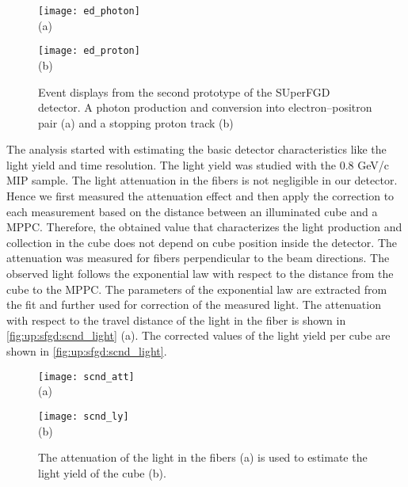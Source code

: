 \documentclass[main.tex]{subfiles}
\begin{document}
\begin{figure}[!ht]
	\centering
	\begin{minipage}{0.49\linewidth}
		\centering
		\texttt{[image: ed\_photon]} \\ (a)
	\end{minipage}
	\begin{minipage}{0.49\linewidth}
		\centering
		\texttt{[image: ed\_proton]} \\ (b)
	\end{minipage}
	\caption{Event displays from the second prototype of the SUperFGD detector. A photon production and conversion into electron--positron pair (a) and a stopping proton track (b)}
	\label{fig:up:sfgd:scnd_ed}
\end{figure}

The analysis started with estimating the basic detector characteristics like the light yield and time resolution. The light yield was studied with the 0.8 GeV/c MIP sample. The light attenuation in the fibers is not negligible in our detector. Hence we first measured the attenuation effect and then apply the correction to each measurement based on the distance between an illuminated cube and a MPPC. Therefore, the obtained value that characterizes the light production and collection in the cube does not depend on cube position inside the detector. The attenuation was measured for fibers perpendicular to the beam directions. The observed light follows the exponential law with respect to the distance from the cube to the MPPC. The parameters of the exponential law are extracted from the fit and further used for correction of the measured light. The attenuation with respect to the travel distance of the light in the fiber is shown in \autoref{fig:up:sfgd:scnd_light} (a). The corrected values of the light yield per cube are shown in \autoref{fig:up:sfgd:scnd_light}.

\begin{figure}[!ht]
	\centering
	\begin{minipage}{0.49\linewidth}
		\centering
		\texttt{[image: scnd\_att]} \\ (a)
	\end{minipage}
	\begin{minipage}{0.49\linewidth}
		\centering
		\texttt{[image: scnd\_ly]} \\ (b)
	\end{minipage}
	\caption{The attenuation of the light in the fibers (a) is used to estimate the light yield of the cube (b).}
	\label{fig:up:sfgd:scnd_light}
\end{figure}
\end{document}
